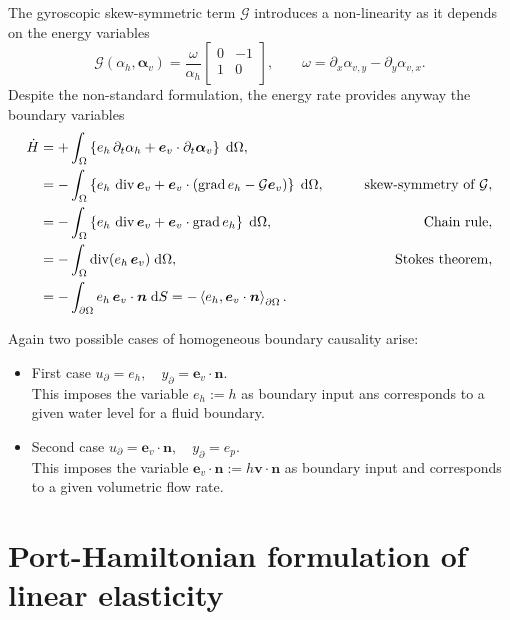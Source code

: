 The gyroscopic skew-symmetric term $\mathcal{G}$ introduces a non-linearity as it depends on the energy variables
\[
\mathcal{G}(\alpha_h, \bm{\alpha}_v) = \frac{\omega}{\alpha_h} \begin{bmatrix}
0 & -1 \\
1 & 0 \\
\end{bmatrix}, \qquad \omega = \partial_x \alpha_{v, y} - \partial_y \alpha_{v, x}.
\]
Despite the non-standard formulation, the energy rate provides anyway the boundary variables
\begin{align*}
\dot{H} &= +\int_{\Omega} \left\{ e_h \, \partial_t \alpha_h + \bm{e}_v \cdot \partial_t \bm{\alpha}_v \right\} \d\Omega, \\
&= -\int_{\Omega} \left\{ e_h \, \div \bm{e}_v + \bm{e}_v \cdot (\grad e_h - \mathcal{G} \bm{e}_v) \right\} \d\Omega, \qquad &\text{skew-symmetry of }\mathcal{G}, \\
&= -\int_{\Omega} \left\{e_h \, \div \bm{e}_v + \bm{e}_v \cdot \grad e_h \right\}\d\Omega, \qquad &\text{Chain rule},  \\
&= -\int_{\Omega} \div(e_h \, \bm{e}_v) \d\Omega, \qquad &\text{Stokes theorem}, \\
&= -\int_{\partial \Omega} e_h \, \bm{e}_v\cdot\bm{n} \d{S} = -\inner[\partial\Omega]{e_h}{\bm{e}_v \cdot\bm{n}}.
\end{align*}

Again two possible cases of homogeneous boundary causality arise:
\begin{itemize}
	\item {First case} ${u}_\partial = e_h, \quad {y}_\partial = \bm{e}_v \cdot\bm{n}$. \\
	This imposes the variable $e_h:= h$ as boundary input ans corresponds to a given water level for a fluid boundary.
	
	\item {Second case} ${u}_\partial = \bm{e}_v \cdot\bm{n}, \quad {y}_\partial = e_p$. \\
	This imposes the variable $\bm{e}_v \cdot\bm{n}:= h \bm{v} \cdot \bm{n}$ as boundary input and corresponds to a given volumetric flow rate.
\end{itemize} 

\section{Port-Hamiltonian formulation of linear elasticity}\label{sec:pHelas}

